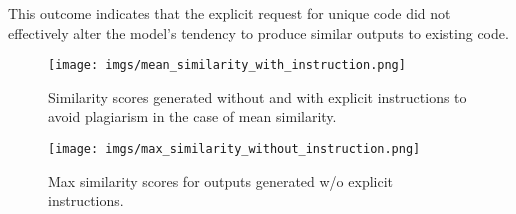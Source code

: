This outcome indicates that the explicit request for unique code did not effectively alter the model's tendency to produce similar outputs to existing code.




\begin{figure}[h]
    \centering
    \texttt{[image: imgs/mean\_similarity\_with\_instruction.png]}
    \vspace{-10pt} 
    
    \caption{Similarity scores generated without and with explicit instructions to avoid plagiarism in the case of mean similarity.}
    \label{fig:mean_similarity_with_instruction}
\end{figure}

\begin{figure}[h]
    \centering
    \texttt{[image: imgs/max\_similarity\_without\_instruction.png]}
    \vspace{-10pt} 
    
    \caption{Max similarity scores for outputs generated w/o explicit instructions.}
    \label{fig:max_similarity_without_instruction}
\end{figure}




\noindent {}


